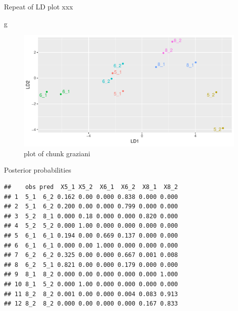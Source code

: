 \documentclass[ignorenonframetext,]{beamer}
\newenvironment{Shaded}{\begin{snugshade}}{\end{snugshade}}
\newcommand{\DataTypeTok}[1]{\textcolor[rgb]{0.13,0.29,0.53}{#1}}
\newcommand{\DecValTok}[1]{\textcolor[rgb]{0.00,0.00,0.81}{#1}}
\newcommand{\KeywordTok}[1]{\textcolor[rgb]{0.13,0.29,0.53}{\textbf{#1}}}
\newcommand{\NormalTok}[1]{#1}
\newcommand{\OperatorTok}[1]{\textcolor[rgb]{0.81,0.36,0.00}{\textbf{#1}}}
\newcommand{\StringTok}[1]{\textcolor[rgb]{0.31,0.60,0.02}{#1}}
\begin{document}
\begin{frame}[fragile]{Repeat of LD plot xxx}
\protect\hypertarget{repeat-of-ld-plot-xxx}{}

\begin{Shaded}
\begin{Highlighting}[]
\NormalTok{g}
\end{Highlighting}
\end{Shaded}

\begin{figure}
\centering
\includegraphics{figure/graziani-1.pdf}
\caption{plot of chunk graziani}
\end{figure}

\end{frame}

\begin{frame}[fragile]{Posterior probabilities}
\protect\hypertarget{posterior-probabilities-1}{}

\footnotesize

\begin{Shaded}
\end{Shaded}

\begin{verbatim}
##    obs pred  X5_1 X5_2  X6_1  X6_2  X8_1  X8_2
## 1  5_1  6_2 0.162 0.00 0.000 0.838 0.000 0.000
## 2  5_1  6_2 0.200 0.00 0.000 0.799 0.000 0.000
## 3  5_2  8_1 0.000 0.18 0.000 0.000 0.820 0.000
## 4  5_2  5_2 0.000 1.00 0.000 0.000 0.000 0.000
## 5  6_1  6_1 0.194 0.00 0.669 0.137 0.000 0.000
## 6  6_1  6_1 0.000 0.00 1.000 0.000 0.000 0.000
## 7  6_2  6_2 0.325 0.00 0.000 0.667 0.001 0.008
## 8  6_2  5_1 0.821 0.00 0.000 0.179 0.000 0.000
## 9  8_1  8_2 0.000 0.00 0.000 0.000 0.000 1.000
## 10 8_1  5_2 0.000 1.00 0.000 0.000 0.000 0.000
## 11 8_2  8_2 0.001 0.00 0.000 0.004 0.083 0.913
## 12 8_2  8_2 0.000 0.00 0.000 0.000 0.167 0.833
\end{verbatim}

\normalsize

\end{frame}
\end{document}
